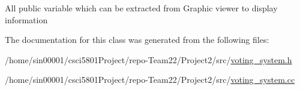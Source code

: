 All public variable which can be extracted from Graphic viewer to display information 

The documentation for this class was generated from the following files\+:\begin{DoxyCompactItemize}
\item 
/home/sin00001/csci5801\+Project/repo-\/\+Team22/\+Project2/src/\hyperlink{voting__system_8h}{voting\+\_\+system.\+h}\item 
/home/sin00001/csci5801\+Project/repo-\/\+Team22/\+Project2/src/\hyperlink{voting__system_8cc}{voting\+\_\+system.\+cc}\end{DoxyCompactItemize}
